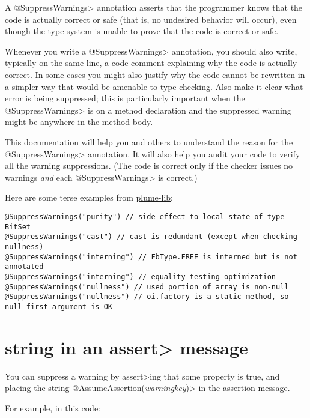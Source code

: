 A \<@SuppressWarnings> annotation asserts that the programmer knows that
the code is actually correct or safe (that is, no undesired behavior will
occur), even though the type system is unable to prove that the code is
correct or safe.

Whenever you write a \<@SuppressWarnings> annotation, you should also
write, typically on the same line, a code comment
explaining why the code is actually correct.  In some cases you might also
justify why the code cannot be rewritten in a simpler way that would be
amenable to type-checking.  Also make it clear what error is being
suppressed; this is particularly important when the \<@SuppressWarnings> is
on a method declaration and the suppressed warning might be anywhere in the
method body.

This documentation will help you and others to understand the reason for
the \<@SuppressWarnings> annotation.  It will also help you audit your code
to verify all the warning suppressions.  (The code is correct only if the
checker issues no warnings \emph{and} each \<@SuppressWarnings> is correct.)

Here are some terse examples from \href{https://mernst.github.io/plume-lib/}{plume-lib}:

\begin{Verbatim}
@SuppressWarnings("purity") // side effect to local state of type BitSet
@SuppressWarnings("cast") // cast is redundant (except when checking nullness)
@SuppressWarnings("interning") // FbType.FREE is interned but is not annotated
@SuppressWarnings("interning") // equality testing optimization
@SuppressWarnings("nullness") // used portion of array is non-null
@SuppressWarnings("nullness") // oi.factory is a static method, so null first argument is OK
\end{Verbatim}



\section{ string in an \<assert> message\label{assumeassertion}}

\begin{sloppypar}
You can suppress a warning by \<assert>ing that some property is true, and
placing the string \<@AssumeAssertion(\emph{warningkey})> in the assertion
message.
\end{sloppypar}

For example, in this code:

